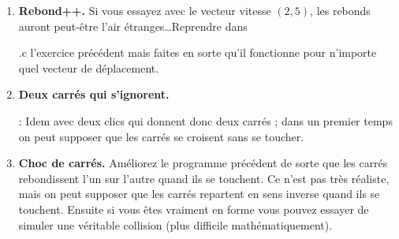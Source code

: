 \documentclass[11pt,a4paper]{article}
\newcommand{\checkbox}{$\square$ \smallskip}
\newcounter{exo} \setcounter{exo}{0}
\newenvironment{action}{%
    \begin{enumerate}[\numerotation] \addtocounter{exo}{-1}%
        }{%
    \end{enumerate}
}
\newcommand{\numexoa}{\theexo \addtocounter{exo}{1}}
\newcommand{\numerotation}{\checkbox \smallskip \numexoa.}
\newcounter{exoo} \setcounter{exoo}{0}
\newcommand{\numexo}{\theexoo}
\newcommand{\repexo}{{\tt exo_\numexo}}
\newcommand{\exoplus}{\addtocounter{exoo}{1}}
\begin{document}
\begin{action}
\item {\bf Rebond++.} Si vous essayez avec le vecteur vitesse $(2,5)$, les rebonds auront peut-être l'air \'etranges\ldots Reprendre dans \exoplus \repexo.c l'exercice précédent mais faites en sorte qu'il fonctionne pour n'importe quel vecteur de déplacement.
\item {\bf Deux carrés qui s'ignorent.} \exoplus \repexo : Idem avec deux clics qui donnent donc deux carrés ; dans un premier temps on peut supposer que les carrés se croisent sans se toucher.
\item {\bf Choc de carrés.} Améliorez le programme précédent de sorte que les carrés rebondissent l'un sur l'autre quand ils se touchent. Ce n'est pas très réaliste, mais on peut supposer que les carrés repartent en sens inverse quand ils se touchent. Ensuite si vous êtes vraiment en forme vous pouvez essayer de simuler une véritable collision (plus difficile mathématiquement).
\end{action}
\end{document}
